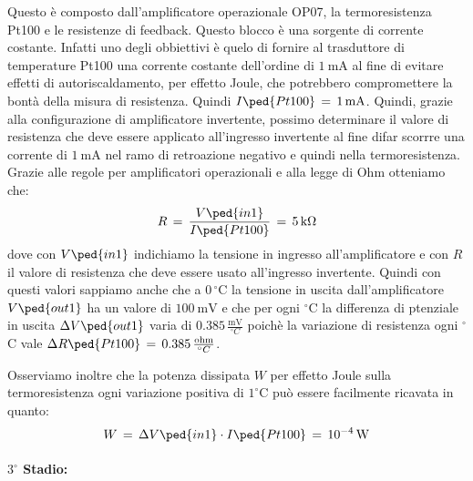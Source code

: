 Questo è composto dall'amplificatore operazionale OP07, la termoresistenza Pt100 e le resistenze di feedback. Questo blocco è una sorgente di corrente costante. Infatti uno degli obbiettivi è quelo di fornire al trasduttore di temperature Pt100 una corrente costante dell'ordine di $\SI{1}{\milli\ampere}$ al fine di evitare effetti di autoriscaldamento, per effetto Joule, che potrebbero compromettere la bontà della misura di resistenza. Quindi $I\ped{Pt100}\,=\,\SI{1}{\milli\ampere}$. Quindi, grazie alla configurazione di amplificatore invertente, possimo determinare il valore di resistenza che deve essere applicato all'ingresso invertente al fine difar scorrre una corrente di $\SI{1}{\milli\ampere}$ nel ramo di retroazione negativo e quindi nella termoresistenza. Grazie alle regole per amplificatori operazionali e alla legge di Ohm otteniamo che:
\begin{equation}
	R\,=\,\frac{V\ped{in1}}{I\ped{Pt100}}\,=\,\SI{5}{\kilo\ohm}
\end{equation}
dove con $V\ped{in1}$ indichiamo la tensione in ingresso all'amplificatore e con $R$ il valore di resistenza che deve essere usato all'ingresso invertente.
Quindi con questi valori sappiamo anche che a $0\,^\circ$C la tensione in uscita dall'amplificatore $V\ped{out1}$ ha un valore di $\SI{100}{\milli\volt}$ e che per ogni $^\circ$C la differenza di ptenziale in uscita $\Delta V\ped{out1}$ varia di $0.385\,\frac{\si{\milli\volt}}{^\circ C}$ poichè la variazione di resistenza ogni $^\circ$C vale $\Delta R\ped{Pt100}\,=\,0.385\,\frac{\si{ohm}}{^\circ C}$.

Osserviamo inoltre che la potenza dissipata $W$ per effetto Joule sulla termoresistenza ogni variazione positiva di $1^\circ$C può essere facilmente ricavata in quanto: 
\begin{equation}
	W\,=\,\Delta V\ped{in1} \cdot I\ped{Pt100}\,=\,10^{-4}\,\si{\watt}
\end{equation}

\paragraph*{$3^\circ$ Stadio:}

